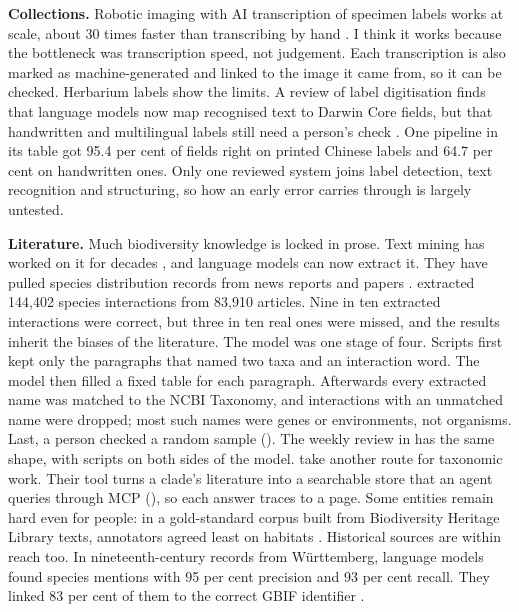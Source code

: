 \textbf{Collections.} Robotic imaging with AI transcription of specimen labels
works at scale, about 30 times faster than transcribing by hand
\parencite{johnson2026collections}. I think it works because the bottleneck was
transcription speed, not judgement. Each transcription is also marked as
machine-generated and linked to the image it came from, so it can be checked.
Herbarium labels show the limits. A review of label digitisation finds that
language models now map recognised text to Darwin Core fields, but that
handwritten and multilingual labels still need a person's check
\parencite{abbad2026herbarium}. One pipeline in its table got 95.4 per cent of
fields right on printed Chinese labels and 64.7 per cent on handwritten ones.
Only one reviewed system joins label detection, text recognition and
structuring, so how an early error carries through is largely untested.

\textbf{Literature.} Much biodiversity knowledge is locked in prose. Text mining
has worked on it for decades \parencite{thessen2012nlp,farrell2024textmining}, and
language models can now extract it. They have pulled species distribution
records from news reports and papers \parencite{castro2024unstructured}.
\textcite{keck2026interactions} extracted 144{,}402 species interactions from
83{,}910 articles. Nine in ten extracted interactions were correct, but three in
ten real ones were missed, and the results inherit the biases of the literature.
The model was one stage of four. Scripts first kept only the paragraphs that
named two taxa and an interaction word. The model then filled a fixed table
for each paragraph. Afterwards every extracted name was matched to the NCBI
Taxonomy, and interactions with an unmatched name were dropped; most such
names were genes or environments, not organisms. Last, a person checked a
random sample (). The weekly review in
 has the same shape, with scripts on both sides of
the model.
\textcite{church2026corpus} take another route for taxonomic work. Their tool
turns a clade's literature into a searchable store that an agent queries
through MCP (), so each answer traces to a page. Some
entities remain hard even for people: in a gold-standard corpus built from
Biodiversity Heritage Library texts, annotators agreed least on habitats
\parencite{nguyen2019copious}. Historical sources are within reach too. In
nineteenth-century records from W\"urttemberg, language models found species
mentions with 95 per cent precision and 93 per cent recall. They linked 83 per
cent of them to the correct GBIF identifier \parencite{teich2026wurttemberg}.

